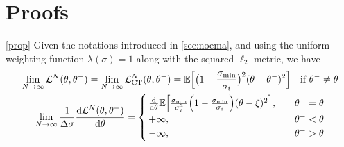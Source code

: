 \section{Proofs}\label{app:proof}
\begin{customprop}{\ref{prop}}
    Given the notations introduced in \cref{sec:noema}, and using the uniform weighting function $\lambda(\sigma) = 1$ along with the squared $\ell_2$ metric, we have
    \begin{gather}
        \lim_{N \to \infty}\mathcal{L}^N(\theta, \theta^-) = \lim_{N \to \infty}\mathcal{L}^N_\text{CT}(\theta, \theta^-) = \mathbb{E}\Big[ \big(1 - \frac{\sigma_\text{min}}{\sigma_i} \big)^2(\theta - \theta^{-})^2\Big] \quad \text{if $\theta^{-}\neq \theta$}\\
        \lim_{N \to \infty}\frac{1}{\Delta \sigma} \frac{\mathop{}\!\mathrm{d} \mathcal{L}^N(\theta, \theta^{-})}{\mathop{}\!\mathrm{d} \theta} = \begin{cases}
            \frac{\mathop{}\!\mathrm{d}}{\mathop{}\!\mathrm{d}\theta} \mathbb{E}\Big[ \frac{\sigma_\text{min}}{\sigma_i^2}\Big( 1 - \frac{\sigma_\text{min}}{\sigma_i} \Big)(\theta - \xi)^2 \Big], &\quad \theta^{-} = \theta\\
            +\infty, &\quad \theta^{-} < \theta \\
            -\infty, &\quad \theta^{-} > \theta \\
        \end{cases}
    \end{gather}
\end{customprop}
